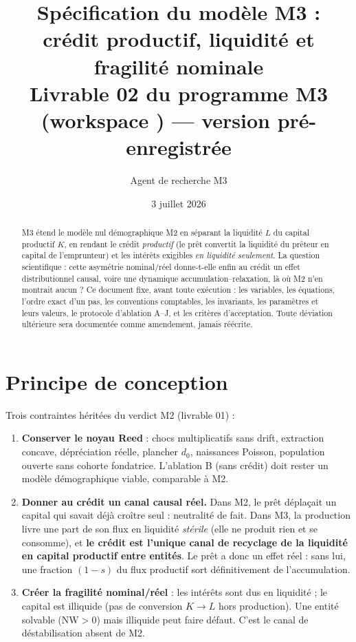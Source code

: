 \documentclass[11pt,a4paper]{article}
\title{Spécification du modèle M3 : crédit productif, liquidité et fragilité
nominale\\
\large Livrable 02 du programme M3 (workspace \code{m3\_credit\_soc}) ---
version pré-enregistrée}
\author{Agent de recherche M3}
\date{3 juillet 2026}
\newcommand{\NW}{\mathrm{NW}}
\begin{document}
\maketitle

\begin{abstract}
M3 étend le modèle nul démographique M2 en séparant la liquidité $L$ du
capital productif $K$, en rendant le crédit \emph{productif} (le prêt convertit
la liquidité du prêteur en capital de l'emprunteur) et les intérêts exigibles
\emph{en liquidité seulement}. La question scientifique : cette asymétrie
nominal/réel donne-t-elle enfin au crédit un effet distributionnel causal, voire
une dynamique accumulation--relaxation, là où M2 n'en montrait aucun ? Ce
document fixe, avant toute exécution : les variables, les équations, l'ordre
exact d'un pas, les conventions comptables, les invariants, les paramètres et
leurs valeurs, le protocole d'ablation A--J, et les critères d'acceptation.
Toute déviation ultérieure sera documentée comme amendement, jamais réécrite.
\end{abstract}

\section{Principe de conception}

Trois contraintes héritées du verdict M2 (livrable 01) :
\begin{enumerate}[leftmargin=1.6em, itemsep=2pt]
\item \textbf{Conserver le noyau Reed} : chocs multiplicatifs sans drift,
  extraction concave, dépréciation réelle, plancher $d_0$, naissances Poisson,
  population ouverte sans cohorte fondatrice. L'ablation B (sans crédit) doit
  rester un modèle démographique viable, comparable à M2.
\item \textbf{Donner au crédit un canal causal réel.} Dans M2, le prêt
  déplaçait un capital qui savait déjà croître seul : neutralité de fait. Dans
  M3, la production livre une part de son flux en liquidité \emph{stérile}
  (elle ne produit rien et se consomme), et \textbf{le crédit est l'unique
  canal de recyclage de la liquidité en capital productif entre entités}. Le
  prêt a donc un effet réel : sans lui, une fraction $(1-s)$ du flux productif
  sort définitivement de l'accumulation.
\item \textbf{Créer la fragilité nominal/réel} : les intérêts sont dus en
  liquidité ; le capital est illiquide (pas de conversion $K \to L$ hors
  production). Une entité solvable ($\NW > 0$) mais illiquide peut faire
  défaut. C'est le canal de déstabilisation absent de M2.
\end{enumerate}
\end{document}
